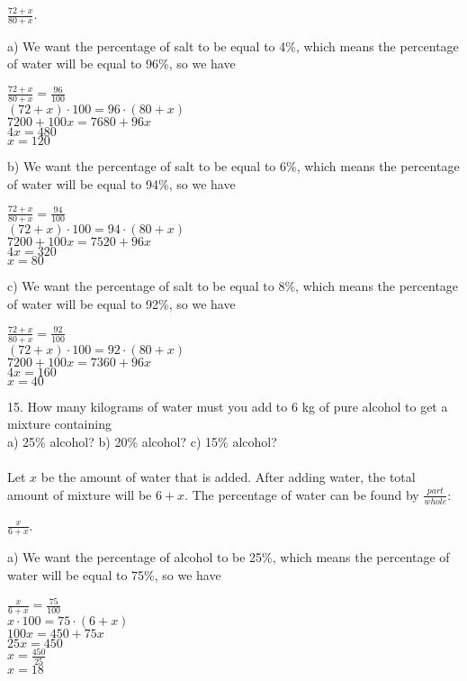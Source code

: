 \documentclass[12pt]{article}
\begin{document}
\begin{center}
$\displaystyle \frac{72+x}{80+x}$.
\end{center}
a) We want the percentage of salt to be equal to 4\%, which means the percentage of water will be equal to 96\%, so we have
\begin{center}
$\displaystyle \frac{72+x}{80+x}=\displaystyle \frac{96}{100}$ \\
$(72+x)\cdot100=96\cdot(80+x)$ \\
$7200+100x=7680+96x$ \\
$4x=480$ \\
$x=120$
\end{center}
b) We want the percentage of salt to be equal to 6\%, which means the percentage of water will be equal to 94\%, so we have
\begin{center}
$\displaystyle \frac{72+x}{80+x}=\displaystyle \frac{94}{100}$ \\
$(72+x)\cdot100=94\cdot(80+x)$ \\
$7200+100x=7520+96x$ \\
$4x=320$ \\
$x=80$
\end{center}
c) We want the percentage of salt to be equal to 8\%, which means the percentage of water will be equal to 92\%, so we have
\begin{center}
$\displaystyle \frac{72+x}{80+x}=\displaystyle \frac{92}{100}$ \\
$(72+x)\cdot100=92\cdot(80+x)$ \\
$7200+100x=7360+96x$ \\
$4x=160$ \\
$x=40$
\end{center}
15. How many kilograms of water must you add to 6 kg of pure alcohol to get a mixture containing \\
a) 25\% alcohol? \hfill b) 20\% alcohol? \hfill c) 15\% alcohol? \\
\\
Let $x$ be the amount of water that is added. After adding water, the total amount of mixture will be $6+x$. The percentage of water can be found by $\displaystyle \frac{part}{whole}$:
\begin{center}
$\displaystyle \frac{x}{6+x}$.
\end{center}
a) We want the percentage of alcohol to be 25\%, which means the percentage of water will be equal to 75\%, so we have
\begin{center}
$\displaystyle \frac{x}{6+x}=\displaystyle \frac{75}{100}$ \\
$x\cdot100=75\cdot(6+x)$ \\
$100x=450+75x$ \\
$25x=450$ \\
$x=\displaystyle \frac{450}{25}$ \\
$x=18$
\end{center}
\end{document}
